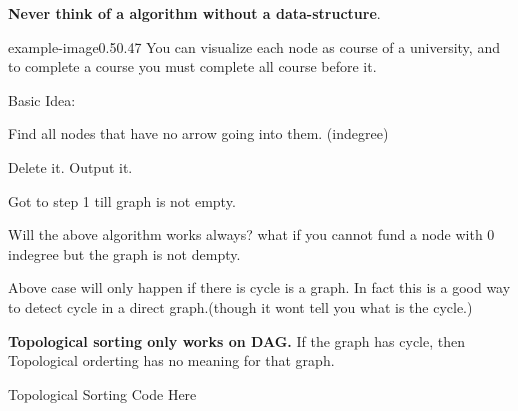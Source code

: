 \begin{marginfigure}
    \vspace{2mm}
    
    \raggedright
    \textbf{
        Never think of a algorithm without a data-structure}.
\end{marginfigure}

\vspace{5cm}
\begin{lfigure}{example-image}{0.5}{0.47}
    You can visualize each node as course of a university, and to complete a course you must complete all course before it.

    Basic Idea:
    \begin{compactenum}
        \item Find all nodes that have no arrow going into them. (indegree)
        \item Delete it. Output it.
        \item Got to step 1 till graph is not empty.
    \end{compactenum}
\end{lfigure}

Will the above algorithm works always? what if you cannot fund a node with 0 indegree but the graph is not dempty.

Above case will only happen if there is cycle is a graph. In fact this is a good way to detect cycle in a direct graph.(though it wont tell you what is the cycle.)

\textbf{Topological sorting only works on DAG.} If the graph has cycle, then Topological orderting has no meaning for that graph.

\medskip
\begin{code3}
    Topological Sorting Code Here
\end{code3}






